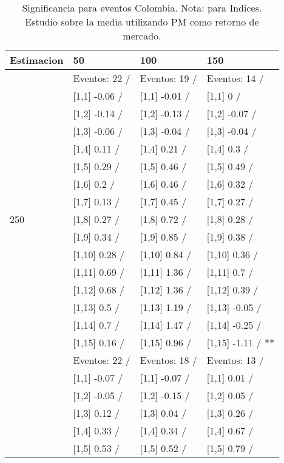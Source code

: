 \begin{table}

\caption{Significancia para eventos Colombia. Nota: para Indices. Estudio sobre la media utilizando PM como retorno de mercado.}
\centering
\begin{tabular}[t]{llll}
\toprule
Estimacion & 50 & 100 & 150\\
\midrule
 & Eventos:  22 / & Eventos:  19 / & Eventos:  14 /\\
 & {}[1,1] -0.06  / & {}[1,1] -0.01  / & {}[1,1] 0  /\\
 & {}[1,2] -0.14  / & {}[1,2] -0.13  / & {}[1,2] -0.07  /\\
 & {}[1,3] -0.06  / & {}[1,3] -0.04  / & {}[1,3] -0.04  /\\
 & {}[1,4] 0.11  / & {}[1,4] 0.21  / & {}[1,4] 0.3  /\\
\addlinespace
 & {}[1,5] 0.29  / & {}[1,5] 0.46  / & {}[1,5] 0.49  /\\
 & {}[1,6] 0.2  / & {}[1,6] 0.46  / & {}[1,6] 0.32  /\\
 & {}[1,7] 0.13  / & {}[1,7] 0.45  / & {}[1,7] 0.27  /\\
250 & {}[1,8] 0.27  / & {}[1,8] 0.72  / & {}[1,8] 0.28  /\\
 & {}[1,9] 0.34  / & {}[1,9] 0.85  / & {}[1,9] 0.38  /\\
\addlinespace
 & {}[1,10] 0.28  / & {}[1,10] 0.84  / & {}[1,10] 0.36  /\\
 & {}[1,11] 0.69  / & {}[1,11] 1.36  / & {}[1,11] 0.7  /\\
 & {}[1,12] 0.68  / & {}[1,12] 1.36  / & {}[1,12] 0.39  /\\
 & {}[1,13] 0.5  / & {}[1,13] 1.19  / & {}[1,13] -0.05  /\\
 & {}[1,14] 0.7  / & {}[1,14] 1.47  / & {}[1,14] -0.25  /\\
\addlinespace
 & {}[1,15] 0.16  / & {}[1,15] 0.96  / & {}[1,15] -1.11  / **\\
 & Eventos:  22 / & Eventos:  18 / & Eventos:  13 /\\
 & {}[1,1] -0.07  / & {}[1,1] -0.07  / & {}[1,1] 0.01  /\\
 & {}[1,2] -0.05  / & {}[1,2] -0.15  / & {}[1,2] 0.05  /\\
 & {}[1,3] 0.12  / & {}[1,3] 0.04  / & {}[1,3] 0.26  /\\
\addlinespace
 & {}[1,4] 0.33  / & {}[1,4] 0.34  / & {}[1,4] 0.67  /\\
 & {}[1,5] 0.53  / & {}[1,5] 0.52  / & {}[1,5] 0.79  /\\

\end{tabular}
\end{table}
